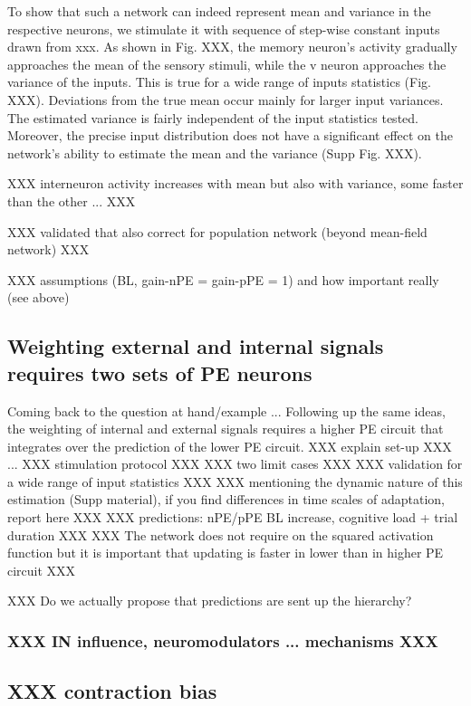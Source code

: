 \documentclass[10pt,a4paper,draft]{article}
\begin{document}
To show that such a network can indeed represent mean and variance in the respective neurons, we stimulate it with sequence of step-wise constant inputs drawn from xxx. As shown in Fig. XXX, the memory neuron's activity gradually approaches the mean of the sensory stimuli, while the v neuron approaches the variance of the inputs. This is true for a wide range of inputs statistics (Fig. XXX). Deviations from the true mean occur mainly for larger input variances. The estimated variance is fairly independent of the input statistics tested. Moreover, the precise input distribution does not have a significant effect on the network's ability to estimate the mean and the variance (Supp Fig. XXX).

XXX interneuron activity increases with mean but also with variance, some faster than the other ... XXX

XXX validated that also correct for population network (beyond mean-field network) XXX

XXX assumptions (BL, gain-nPE = gain-pPE = 1) and how important really (see above)

\subsection*{Weighting external and internal signals requires two sets of PE neurons}
%
Coming back to the question at hand/example ...
Following up the same ideas, the weighting of internal and external signals requires a higher PE circuit that integrates over the prediction of the lower PE circuit. 
XXX explain set-up XXX ...
XXX stimulation protocol XXX
XXX two limit cases XXX
XXX validation for a wide range of input statistics XXX
XXX mentioning the dynamic nature of this estimation (Supp material), if you find differences in time scales of adaptation, report here XXX
XXX predictions: nPE/pPE BL increase, cognitive load + trial duration XXX
XXX The network does not require on the squared activation function but it is important that updating is faster in lower than in higher PE circuit XXX

XXX Do we actually propose that predictions are sent up the hierarchy?

\subsubsection*{XXX IN influence, neuromodulators ... mechanisms XXX}
%



\subsection*{XXX contraction bias}
\end{document}
